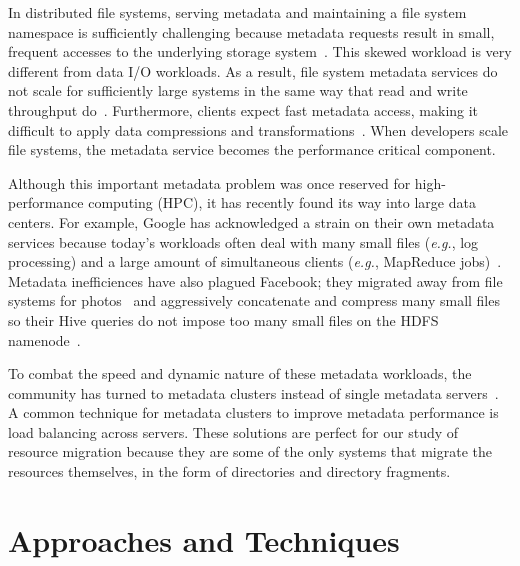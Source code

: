 In distributed file systems, serving metadata and maintaining a file system
namespace is sufficiently challenging because metadata requests result in
small, frequent accesses to the underlying storage
system~\cite{roselli:atec2000-FS-workloads}.  This skewed workload is very
different from data I/O workloads. As a result, file system metadata services
do not scale for sufficiently large systems in the same way that read and write
throughput do~\cite{abad:techreport2012-fstrace, abad:ucc2012-mimesis,
alam:pdsw2011-metadata-scaling, weil:osdi2006-ceph}.  Furthermore, clients
expect fast metadata access, making it difficult to apply data compressions and
transformations~\cite{leung:atc2008-nfs-trace}. When developers scale file
systems, the metadata service becomes the performance critical component. 

Although this important metadata problem was once reserved for high-performance
computing (HPC), it has recently found its way into large data centers. For
example, Google has acknowledged a strain on their own metadata services
because today's workloads often deal with many small files ({\it e.g.}, log
processing) and a large amount of simultaneous clients ({\it e.g.}, MapReduce
jobs)~\cite{mckusick:acm2010-gfs-evolution}. Metadata inefficiences have also
plagued Facebook; they migrated away from file systems for
photos~\cite{beaver:osdi2010-haystack} and aggressively concatenate and
compress many small files so their Hive queries do not impose too many small
files on the HDFS namenode~\cite{thusoo:sigmod2010-facebook-infrastructure}. 

To combat the speed and dynamic nature of these metadata workloads, the
community has turned to metadata clusters instead of single metadata
servers~\cite{patil:fast2011-giga+,weil:osdi2006-ceph,weil:sc2004-dyn-metadata,
sinnamohideen:atc2010-ursa, xing:sc2009-skyfs}.  A common technique for
metadata clusters to improve metadata performance is load balancing across
servers. These solutions are perfect for our study of resource migration
because they are some of the only systems that migrate the resources
themselves, in the form of directories and directory fragments. 


\section{Approaches and Techniques}

